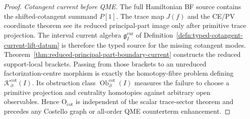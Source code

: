 \begin{proof}
\emph{Cotangent current before QME.}  The full Hamiltonian BF source
contains the shifted-cotangent summand \(P[1]\).  The trace map
\(J(f)\) and the CE/PV coordinate theorem see its reduced
principal-part image only after primitive trace projection.  The
interval current algebra
\(\mathfrak g_I^{\mathrm{cur}}\) of
Definition~\ref{defn:typed-cotangent-current-lift-datum} is therefore
the typed source for the missing cotangent modes.  Theorem~\ref{thm:reduced-principal-part-boundary-current}
constructs the reduced support-local brackets.  Passing from those
brackets to an unreduced factorization-centre morphism is exactly the
homotopy-fibre problem defining
\(\mathcal K^{\mathrm{cot}}_\partial(I)\).  Its obstruction class
\(\operatorname{Ob}^{\mathrm{cot}}_\partial(I)\) measures the failure to
choose a primitive projection and centrality homotopies against
arbitrary open observables.  Hence \(\mathrm{O}_{\mathrm{cot}}\) is
independent of the scalar trace-sector theorem and precedes any
Costello graph or all-order QME counterterm enhancement.


\end{proof}
